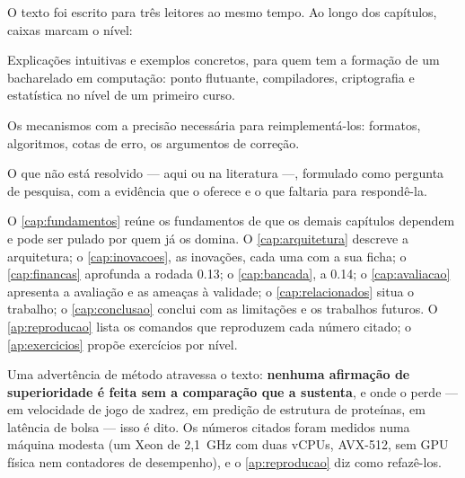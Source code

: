O texto foi escrito para três leitores ao mesmo tempo. Ao longo dos capítulos, caixas marcam o nível:

\begin{graduacao}
Explicações intuitivas e exemplos concretos, para quem tem a formação de um bacharelado em computação: ponto flutuante, compiladores, criptografia e estatística no nível de um primeiro curso.
\end{graduacao}

\begin{mestrado}
Os mecanismos com a precisão necessária para reimplementá-los: formatos, algoritmos, cotas de erro, os argumentos de correção.
\end{mestrado}

\begin{doutorado}
O que não está resolvido --- aqui ou na literatura ---, formulado como pergunta de pesquisa, com a evidência que o \vapor{} oferece e o que faltaria para respondê-la.
\end{doutorado}

O \autoref{cap:fundamentos} reúne os fundamentos de que os demais capítulos dependem e pode ser pulado por quem já os domina. O \autoref{cap:arquitetura} descreve a arquitetura; o \autoref{cap:inovacoes}, as inovações, cada uma com a sua ficha; o \autoref{cap:financas} aprofunda a rodada 0.13; o \autoref{cap:bancada}, a 0.14; o \autoref{cap:avaliacao} apresenta a avaliação e as ameaças à validade; o \autoref{cap:relacionados} situa o trabalho; o \autoref{cap:conclusao} conclui com as limitações e os trabalhos futuros. O \autoref{ap:reproducao} lista os comandos que reproduzem cada número citado; o \autoref{ap:exercicios} propõe exercícios por nível.

Uma advertência de método atravessa o texto: \textbf{nenhuma afirmação de superioridade é feita sem a comparação que a sustenta}, e onde o \vapor{} perde --- em velocidade de jogo de xadrez, em predição de estrutura de proteínas, em latência de bolsa --- isso é dito. Os números citados foram medidos numa máquina modesta (um Xeon de 2,1~GHz com duas vCPUs, AVX-512, sem GPU física nem contadores de desempenho), e o \autoref{ap:reproducao} diz como refazê-los.
